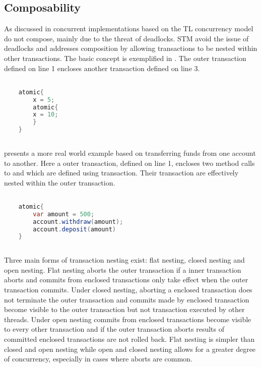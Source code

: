 \subsection{Composability}
As discussed in  concurrent implementations based on the \ac{TL} concurrency model do not compose, mainly due to the threat of deadlocks. \ac{STM} avoid the issue of deadlocks and addresses composition by allowing transactions to be nested within other transactions. The basic concept is exemplified in . The outer transaction defined on line 1 encloses another transaction defined on line 3.

\begin{lstlisting}[label=lst:stm_nested_transactions,
  caption={Nested transactions},
  language=Java,  
  showspaces=false,
  showtabs=false,
  breaklines=true,
  showstringspaces=false,
  breakatwhitespace=true,
  commentstyle=\color{greencomments},
  keywordstyle=\color{bluekeywords},
  stringstyle=\color{redstrings},
  morekeywords={atomic, retry, orElse, var}]  % Start your code-block

	atomic{
		x = 5;
		atomic{
		x = 10;		
		}
	}
       
\end{lstlisting}

 presents a more real world example based on transferring funds from one account to another. Here a outer transaction, defined on line 1, encloses two method calls to  and  which are defined using transaction. Their transaction are effectively nested within the outer transaction.
\begin{lstlisting}[label=lst:stm_nested_transactions_real,
  caption={Real world nested transactions},
  language=Java,  
  showspaces=false,
  showtabs=false,
  breaklines=true,
  showstringspaces=false,
  breakatwhitespace=true,
  commentstyle=\color{greencomments},
  keywordstyle=\color{bluekeywords},
  stringstyle=\color{redstrings},
  morekeywords={atomic, retry, orElse, var}]  % Start your code-block

	atomic{
		var amount = 500;
		account.withdraw(amount);
		account.deposit(amount)
	}
       
\end{lstlisting}

Three main forms of transaction nesting exist: flat nesting, closed nesting and open nesting\cite[p. 1]{kumar2011hparstm}\cite[p. 42]{harris2010transactional}. Flat nesting aborts the outer transaction if a inner transaction aborts and commits from enclosed transactions only take effect when the outer transaction commits. Under closed nesting, aborting a enclosed transaction does not terminate the outer transaction and commits made by enclosed transaction become visible to the outer transaction but not transaction executed by other threads. Under open nesting commits from enclosed transactions become visible to every other transaction and if the outer transaction aborts results of committed enclosed transactions are not rolled back. Flat nesting is simpler than closed and open nesting while open and closed nesting allows for a greater degree of concurrency, especially in cases where aborts are common\cite[p. 43]{harris2010transactional}.

